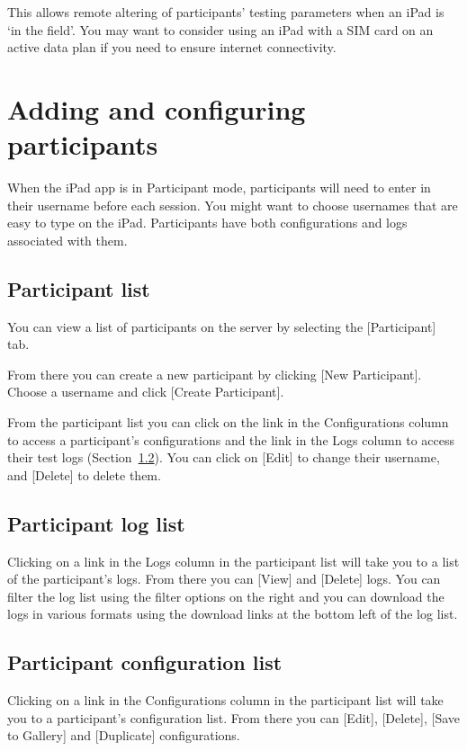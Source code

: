 \documentclass{article}
\begin{document}
This allows remote altering of participants' testing parameters when an iPad is `in the field'. You may want to consider using an iPad with a SIM card on an active data plan if you need to ensure internet connectivity.

\section{Adding and configuring participants}
\label{sec-configuringParticipants}

When the iPad app is in Participant mode, participants will need to enter in their username before each session. You might want to choose usernames that are easy to type on the iPad. Participants have both configurations and logs associated with them.

\subsection{Participant list}

You can view a list of participants on the server by selecting the [Participant] tab.

From there you can create a new participant by clicking [New
Participant].
Choose a username and click [Create Participant].

From the participant list you can click on the link in the Configurations column 
to access
a participant's configurations and the link in the Logs column to access their test logs
(Section~\ref{sec-logList}).
You can click on [Edit] to change their username, 
and [Delete] to delete them.

\subsection{Participant log list}
\label{sec-logList}

Clicking on a link in the Logs column in the participant list will take
you to a list of the participant's logs.
From there you can [View] and [Delete] logs.
You can filter the log list using the filter options on the right and
you can download the logs in various formats using the download links
at the bottom left of the log list.

\subsection{Participant configuration list}
\label{sec-configList}

Clicking on a link in the Configurations column in the participant list
will take you to a participant's configuration list.
From there you can [Edit], [Delete], [Save to Gallery] and
[Duplicate] configurations.
\end{document}
